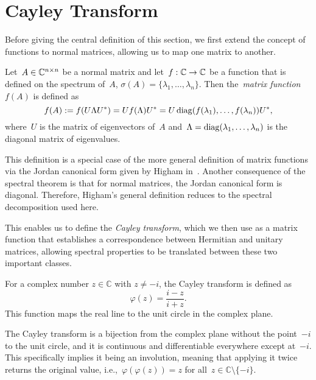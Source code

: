 \section{Cayley Transform}

Before giving the central definition of this section, we first extend the concept of functions to normal matrices, allowing us to map one matrix to another.

\begin{definition} \label{def:matrix_function}
    Let~$A \in \mathbb{C}^{n \times n}$ be a normal matrix and let~$f: \mathbb{C} \to \mathbb{C}$ be a function that is defined on the spectrum of~$A$,
    $\sigma(A) = \{\lambda_1, \ldots, \lambda_n\}$.
    Then the~\emph{matrix function}~$f(A)$ is defined as
    \[
    f(A) := f(U \Lambda U^*) = U f(\Lambda) U^* = U \operatorname{diag}(f(\lambda_1), \ldots, f(\lambda_n)) U^*,
    \]
    where~$U$ is the matrix of eigenvectors of~$A$ and~$\Lambda = \operatorname{diag}(\lambda_1, \ldots, \lambda_n)$ is the diagonal matrix of eigenvalues.
\end{definition}

This definition is a special case of the more general definition of matrix functions via the Jordan canonical form given by Higham in~\cite[p.~3]{higham}. Another consequence of the spectral theorem is that for normal matrices, the Jordan canonical form is diagonal. Therefore, Higham's general definition reduces to the spectral decomposition used here.

This enables us to define the \emph{Cayley transform}, which we then use as a matrix function that establishes a correspondence between Hermitian and unitary matrices, allowing spectral properties to be translated between these two important classes.

For a complex number $z \in \mathbb{C}$ with $z \neq -i$, the Cayley transform is defined as
\[
\varphi(z) = \frac{i - z}{i + z}.
\]
This function maps the real line to the unit circle in the complex plane.
\vspace{0.5cm}

\noindent
The Cayley transform is a bijection from the complex plane without the point~$-i$ to the unit circle, and it is continuous and differentiable everywhere except at~$-i$. This specifically implies it being an involution, meaning that applying it twice returns the original value, i.e.,~$\varphi(\varphi(z)) = z$ for all~$z \in \mathbb{C} \setminus \{-i\}$.

